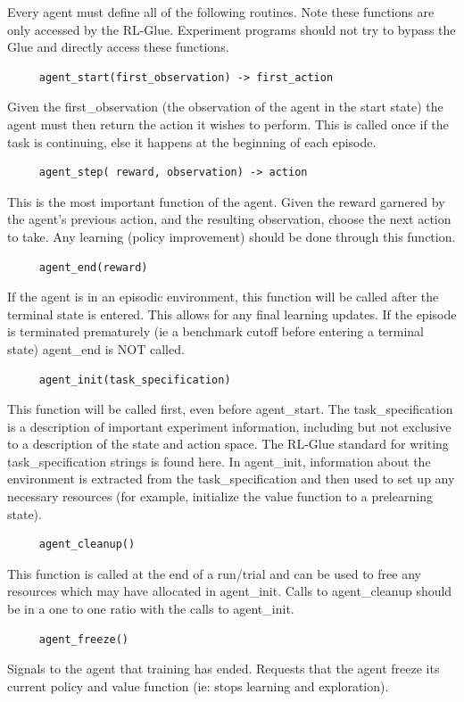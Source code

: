 \documentclass[11pt]{article}
\begin{document}
Every agent must define all of the following routines. Note these functions are only accessed by the RL-Glue. Experiment programs should not try to bypass the Glue and directly access these functions.
\begin{verbatim}
     agent_start(first_observation) -> first_action
\end{verbatim}
Given the first\_observation (the observation of the agent in the start state) the agent must then return the action it wishes to perform. This is called once if the task is continuing, else it happens at the beginning of each episode.
\begin{verbatim}
     agent_step( reward, observation) -> action
\end{verbatim}
This is the most important function of the agent. Given the reward garnered by the agent's previous action, and the resulting observation, choose the next action to take. Any learning (policy improvement) should be done through this function.
\begin{verbatim}
     agent_end(reward)
\end{verbatim}     
If the agent is in an episodic environment, this function will be called after the terminal state is entered. This allows for any final learning updates. If the episode is terminated prematurely (ie a benchmark cutoff before entering a terminal state) agent\_end is NOT called.
\begin{verbatim}
     agent_init(task_specification)
\end{verbatim}     
This function will be called first, even before agent\_start. The task\_specification is a description of important experiment information, including but not exclusive to a description of the state and action space. The RL-Glue standard for writing task\_specification strings is found here.  In agent\_init, information about the environment is extracted from the task\_specification and then used to set up any necessary resources (for example, initialize the value function to a prelearning state).
\begin{verbatim}
     agent_cleanup()
\end{verbatim}     
This function is called at the end of a run/trial and can be used to free any resources which may have allocated in agent\_init. Calls to agent\_cleanup should be in a one to one ratio with the calls to agent\_init.
\begin{verbatim}
     agent_freeze()
\end{verbatim}
Signals to the agent that training has ended. Requests that the agent freeze its current policy and value function (ie: stops learning and exploration).
\end{document}
